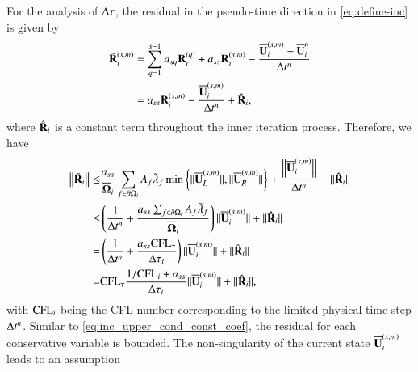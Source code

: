 For the analysis of $\mathrm\Delta\tau$, the residual in the pseudo-time direction in \eqref{eq:define-inc} is given by
\begin{equation}
    \begin{aligned}
        \tilde{\mathbf{R}}_i^{\left(s,m\right)} & = \sum_{q=1}^{s-1} a_{sq} \mathbf{R}_i^{\left(q\right)} + 
    a_{ss} \mathbf{R}_i^{\left(s,m\right)} - 
    \dfrac{\overline{\mathbf{U}}_i^{\left(s,m\right)} - \overline{\mathbf{U}}_i^{n}}{\mathrm\Delta t^n} \\
    & =  a_{ss} \mathbf{R}_i^{\left(s,m\right)} - 
    \dfrac{\overline{\mathbf{U}}_i^{\left(s,m\right)}}{\mathrm\Delta t^n}
    + \hat{\mathbf{R}}_i,
    \end{aligned}
\end{equation}
where $\hat{\mathbf{R}}_i$ is a constant term throughout the inner iteration process. 
Therefore, we have
\begin{equation}
\label{eq:upper-bound-residual-tau}
\begin{aligned}
    \left\| \tilde{\mathbf{R}}_i \right\| 
    \leq & \frac{a_{ss}}{\overline{\mathbf{\Omega}}_i} \sum_{f \in \partial \Omega_i}{
        A_{f} \tilde{\lambda}_{f} \min \left\{\|\overline{\mathbf{U}}_L^{\left(s,m\right)}\|, \|\overline{\mathbf{U}}_R^{\left(s,m\right)}\| \right\}
    } 
    + \dfrac{\left\|\overline{\mathbf{U}}_i^{\left(s,m\right)}\right\|}{\mathrm\Delta t^n}
    + \|\hat{\mathbf{R}}_i\|
    \\
    \leq & \left(
    \frac{1}{\mathrm\Delta t^n} + 
    \frac{a_{ss}\sum_{f \in \partial \Omega_i} A_f\tilde{\lambda}_f}{\overline{\mathbf{\Omega}}_i}
    \right)
    \|\overline{\mathbf{U}}_i^{\left(s,m\right)}\|
    + \|\hat{\mathbf{R}}_i\|\\
    = &
    \left(\frac{1}{\mathrm\Delta t^n} + \frac{a_{ss}\text{CFL}_\tau}{\mathrm\Delta \tau_i} \right)\|\overline{\mathbf{U}}_i^{\left(s,m\right)}\| 
    + \|\hat{\mathbf{R}}_i\|\\
    = &
     \text{CFL}_\tau\frac{1 / \text{CFL}_i + a_{ss}}{\mathrm\Delta \tau_i}
     \|\overline{\mathbf{U}}_i^{\left(s,m\right)}\| 
    + \|\hat{\mathbf{R}}_i\|,
\end{aligned}
\end{equation}
with $\text{CFL}_i$ being the CFL number corresponding to the limited
physical-time step
$\mathrm\Delta t^n$.
Similar to \eqref{eq:inc_upper_cond_const_coef}, 
the residual for each conservative variable is 
bounded. %
The non-singularity of the current state $\overline{\mathbf{U}}_i^{\left(s,m\right)}$ leads to 
an assumption
